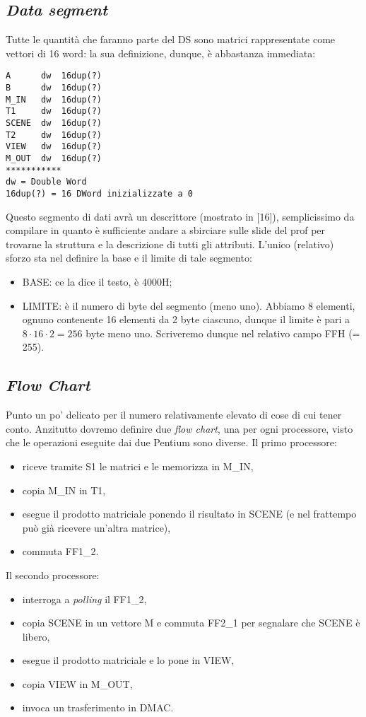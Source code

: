 \subsection{\textit{Data segment}}
\label{sec:dataSegmentesPlay}

Tutte le quantità che faranno parte del DS sono matrici rappresentate come vettori di 16 word: la sua definizione, dunque, è abbastanza immediata:
\begin{verbatim}
A      dw  16dup(?)
B      dw  16dup(?)
M_IN   dw  16dup(?)
T1     dw  16dup(?)
SCENE  dw  16dup(?)
T2     dw  16dup(?)
VIEW   dw  16dup(?)
M_OUT  dw  16dup(?)
***********
dw = Double Word
16dup(?) = 16 DWord inizializzate a 0
\end{verbatim}

Questo segmento di dati avrà un descrittore (mostrato in [16]), semplicissimo da compilare in quanto è sufficiente andare a sbirciare sulle slide del prof per trovarne la struttura e la descrizione di tutti gli attributi.
L'unico (relativo) sforzo sta nel definire la base e il limite di tale segmento:
\begin{itemize}
\item BASE: ce la dice il testo, è 4000H;
\item LIMITE: è il numero di byte del segmento (meno uno). Abbiamo 8 elementi, ognuno contenente 16 elementi da 2 byte ciascuno, dunque il limite è pari a  $8\cdot 16 \cdot 2 = 256$ byte meno uno. Scriveremo dunque nel relativo campo FFH (= 255).
\end{itemize}

\subsection{\textit{Flow Chart}}

Punto un po' delicato per il numero relativamente elevato di cose di cui tener conto.
Anzitutto dovremo definire due \textit{flow chart}, una per ogni processore, visto che le operazioni eseguite dai due Pentium sono diverse.
Il primo processore:
\begin{itemize}
\item riceve tramite S1 le matrici e le memorizza in M\_IN,
\item copia M\_IN in T1,
\item esegue il prodotto matriciale ponendo il risultato in SCENE (e nel frattempo può già ricevere un'altra matrice),
\item commuta FF1\_2.
\end{itemize}
Il secondo processore:
\begin{itemize}
\item interroga a \textit{polling} il FF1\_2,
\item copia SCENE in un vettore M e commuta FF2\_1 per segnalare che SCENE è libero,
\item esegue il prodotto matriciale e lo pone in VIEW,
\item copia VIEW in M\_OUT, 
\item invoca un trasferimento in DMAC.
\end{itemize}

